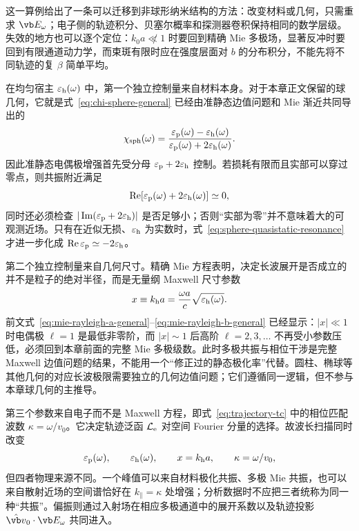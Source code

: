 这一算例给出了一条可以迁移到非球形纳米结构的方法：改变材料或几何，只需重求 $\vb E_\omega$；电子侧的轨迹积分、贝塞尔概率和探测器卷积保持相同的数学层级。失效的地方也可以逐个定位：$k_0a\not\ll1$ 时要回到精确 Mie 多极场，显著反冲时要回到有限通道动力学，而束斑有限时应在强度层面对 $b$ 的分布积分，不能先将不同轨迹的复 $\beta$ 简单平均。


在均匀宿主 $\varepsilon_{\rm h}(\omega)$ 中，第一个独立控制量来自材料本身。对于本章正文保留的球几何，它就是式~\cref{eq:chi-sphere-general} 已经由准静态边值问题和 Mie 渐近共同导出的
\begin{equation}
{
\chi_{\rm sph}(\omega)
=\frac{\varepsilon_{\rm p}(\omega)-\varepsilon_{\rm h}(\omega)}
{\varepsilon_{\rm p}(\omega)+2\varepsilon_{\rm h}(\omega)}.}
\label{eq:material-contrast-factors}
\end{equation}
因此准静态电偶极增强首先受分母
$\varepsilon_{\rm p}+2\varepsilon_{\rm h}$ 控制。若损耗有限而且实部可以穿过零点，则共振附近满足
\begin{equation}
\operatorname{Re}\!\left[\varepsilon_{\rm p}(\omega)+2\varepsilon_{\rm h}(\omega)\right]\simeq0,
\label{eq:sphere-quasistatic-resonance}
\end{equation}
同时还必须检查
$|\operatorname{Im}(\varepsilon_{\rm p}+2\varepsilon_{\rm h})|$
是否足够小；否则“实部为零”并不意味着大的可观测近场。只有在近似无损、$\varepsilon_{\rm h}$ 为实数时，式~\cref{eq:sphere-quasistatic-resonance} 才进一步化成
$\operatorname{Re}\varepsilon_{\rm p}\simeq-2\varepsilon_{\rm h}$。

第二个独立控制量来自几何尺寸。精确 Mie 方程表明，决定长波展开是否成立的并不是粒子的绝对半径，而是无量纲 Maxwell 尺寸参数
\begin{equation}
{x\equiv k_{\rm h}a
=\frac{\omega a}{c}\sqrt{\varepsilon_{\rm h}(\omega)}.}
\label{eq:size-parameter-general}
\end{equation}
前文式~\cref{eq:mie-rayleigh-a-general}--\cref{eq:mie-rayleigh-b-general} 已经显示：$|x|\ll1$ 时电偶极 $\ell=1$ 是最低非零阶，而 $|x|\sim1$ 后高阶 $\ell=2,3,\ldots$ 不再受小参数压低，必须回到本章前面的完整 Mie 多极级数。此时多极共振与相位干涉是完整 Maxwell 边值问题的结果，不能用一个“修正过的静态极化率”代替。圆柱、椭球等其他几何的对应长波极限需要独立的几何边值问题；它们遵循同一逻辑，但不参与本章球几何的主推导。

第三个参数来自电子而不是 Maxwell 方程，即式~\cref{eq:trajectory-tc} 中的相位匹配波数 $\kappa=\omega/v_0$。它决定轨迹泛函 $\mathcal L_{\rm e}$ 对空间 Fourier 分量的选择。故波长扫描同时改变
\begin{equation}
\varepsilon_{\rm p}(\omega),\qquad
\varepsilon_{\rm h}(\omega),\qquad
x=k_{\rm h}a,\qquad
\kappa=\omega/v_0,
\end{equation}
但四者物理来源不同。一个峰值可以来自材料极化共振、多极 Mie 共振，也可以来自散射近场的空间谱恰好在 $k_{\parallel}=\kappa$ 处增强；分析数据时不应把三者统称为同一种“共振”。偏振则通过入射场在相应多极通道中的展开系数以及轨迹投影 $\hat{\vb v}_0\cdot\vb E_\omega$ 共同进入。



